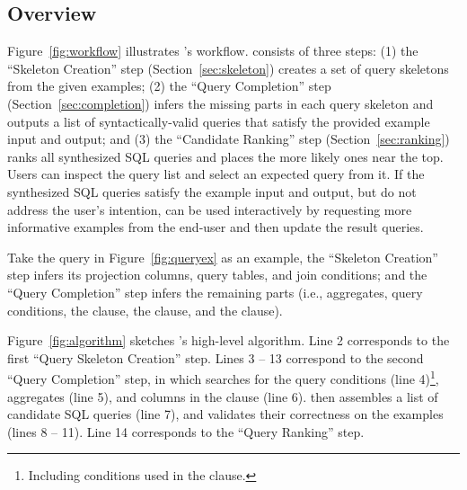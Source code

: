 \subsection{Overview}
\label{sec:algorithm}

Figure~\ref{fig:workflow} illustrates \ourtool's workflow.
\ourtool consists of three steps: (1) the ``Skeleton Creation'' step (Section~\ref{sec:skeleton})
creates a set of query skeletons from the given examples;
(2) the ``Query Completion'' step (Section~\ref{sec:completion}) 
infers the missing parts in each query skeleton and outputs
a list of syntactically-valid queries that satisfy
the provided example input and output; and (3) the ``Candidate Ranking'' step (Section~\ref{sec:ranking})
ranks all synthesized SQL queries and places the more likely ones near the top. 
Users can inspect the query list and select an expected query
from it.
If the synthesized SQL queries satisfy the example input and
output, but do not address the user's intention,
\ourtool can be used interactively by requesting more
informative examples from the end-user and then
update the result queries.

Take the query in Figure~\ref{fig:queryex} as an example,
the ``Skeleton Creation''
step infers its projection columns, query tables, and join conditions; and
the ``Query Completion'' step infers the remaining parts (i.e., aggregates,
query conditions, the  clause, the
 clause, and the  clause).

Figure~\ref{fig:algorithm} sketches \ourtool's high-level algorithm.
Line 2 corresponds to the first ``Query Skeleton
Creation'' step. Lines 3 -- 13 correspond to the second ``Query Completion''
step, in which \ourtool searches for the query conditions (line 4)\footnote{
Including conditions used in the  clause.},
aggregates (line 5), and columns in the  clause (line 6).
\ourtool then assembles a list of candidate SQL queries (line 7), and
validates their correctness on the examples (lines 8 -- 11).
Line 14 corresponds to the ``Query Ranking'' step.


